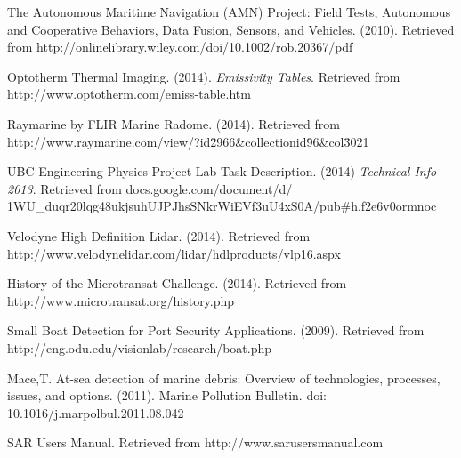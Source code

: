 \begin{thebibliography}{99}


 The Autonomous Maritime Navigation (AMN) Project:
Field Tests, Autonomous and Cooperative Behaviors,
Data Fusion, Sensors, and Vehicles. (2010). Retrieved from http://onlinelibrary.wiley.com/doi/10.1002/rob.20367/pdf

 Optotherm Thermal Imaging. (2014). \textit{Emissivity Tables}. Retrieved from http://www.optotherm.com/emiss-table.htm

 Raymarine by FLIR Marine Radome. (2014). Retrieved from http://www.raymarine.com/view/?id\=2966\&collectionid\=96\&col\=3021

 UBC Engineering Physics Project Lab Task Description. (2014) \textit{Technical Info 2013}. Retrieved from docs.google.com/document/d/\\1WU\_duqr20lqg48ukjsuhUJPJhsSNkrWiEVf3uU4xS0A/pub\#h.f2e6v0ormnoc

 Velodyne High Definition Lidar. (2014). Retrieved from http://www.velodynelidar.com/lidar/hdlproducts/vlp16.aspx

 History of the Microtransat Challenge. (2014). Retrieved from http://www.microtransat.org/history.php

 Small Boat Detection for Port Security Applications. (2009). Retrieved from http://eng.odu.edu/visionlab/research/boat.php

 Mace,T. At-sea detection of marine debris: Overview of technologies, processes, issues, and options. (2011). Marine Pollution Bulletin. doi: 10.1016/j.marpolbul.2011.08.042

 SAR Users Manual. Retrieved from http://www.sarusersmanual.com

\end{thebibliography}